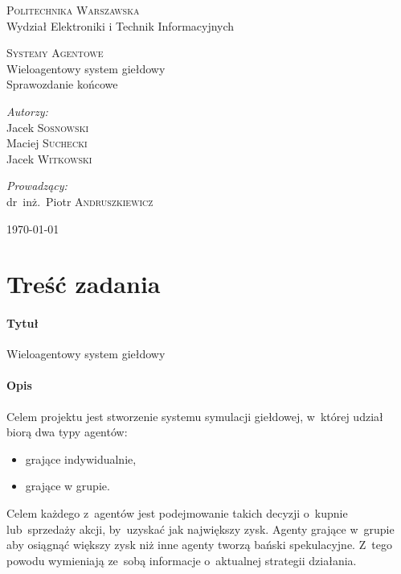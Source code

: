\documentclass[11pt,a4paper]{article}
\begin{document}
\begin{titlepage}
  \begin{center}

    \textsc{\Large Politechnika Warszawska}\\[0.1cm]
    \small Wydział Elektroniki i Technik Informacyjnych
    \vfill

    \textsc{\small Systemy Agentowe}\\[0.1cm]
    \Huge Wieloagentowy system giełdowy\\[1.5cm]
    \small Sprawozdanie końcowe\\[2.5cm]

    \vfill

    \begin{minipage}{0.4\textwidth}
      \begin{flushleft} \large
        \emph{Autorzy:}\\[0.1cm]
        Jacek \textsc{Sosnowski}\\
        Maciej \textsc{Suchecki}\\
        Jacek \textsc{Witkowski}\\
      \end{flushleft}
    \end{minipage}
    \begin{minipage}{0.4\textwidth}
      \begin{flushright} \large
        \emph{Prowadzący:}\\[0.1cm]
        dr~inż.~Piotr \textsc{Andruszkiewicz}\\[1cm]
      \end{flushright}
    \end{minipage}

    \vfill
    {\large \today}

  \end{center}
\end{titlepage}

\section{Treść zadania}
\paragraph{Tytuł} Wieloagentowy system giełdowy
\paragraph{Opis}
Celem projektu jest stworzenie systemu symulacji giełdowej, w~której udział biorą dwa typy agentów:
\begin{itemize}
  \item grające indywidualnie,
  \item grające w grupie.
\end{itemize}
Celem każdego z~agentów jest podejmowanie takich decyzji o~kupnie lub~sprzedaży akcji, by~uzyskać jak największy zysk. Agenty grające w~grupie aby osiągnąć większy zysk niż inne agenty tworzą bański spekulacyjne. Z~tego powodu wymieniają ze~sobą informacje o~aktualnej strategii działania.
\end{document}
